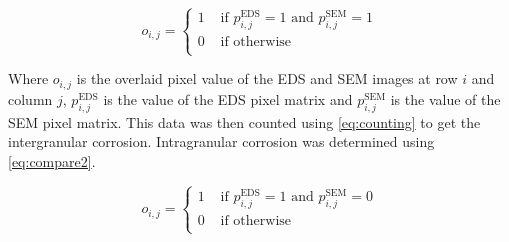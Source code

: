 \documentclass[10pt]{exam}
\begin{document}
\begin{equation}
    o_{i,j} = \begin{cases}
        1 & \text{ if }  p^{\text{EDS}}_{i,j} = 1 \text{ and } p^{\text{SEM}}_{i,j} = 1 \\
        0 & \text{ if otherwise}   \\
    \end{cases}
    \label{eq:compare}
\end{equation}

Where $o_{i,j}$ is the overlaid pixel value of the EDS and SEM images at row
$i$ and column $j$, $p^{\text{EDS}}_{i,j}$ is the value of the EDS pixel matrix
 and $p^{\text{SEM}}_{i,j}$ is the value of the SEM pixel matrix. This data was
 then counted using \cref{eq:counting} to get the intergranular corrosion.
 Intragranular corrosion was determined using \cref{eq:compare2}.

\begin{equation}
    o_{i,j} = \begin{cases}
        1 & \text{ if }  p^{\text{EDS}}_{i,j} = 1 \text{ and } p^{\text{SEM}}_{i,j} = 0 \\
        0 & \text{ if otherwise}   \\
    \end{cases}
    \label{eq:compare2}
\end{equation}
\end{document}
